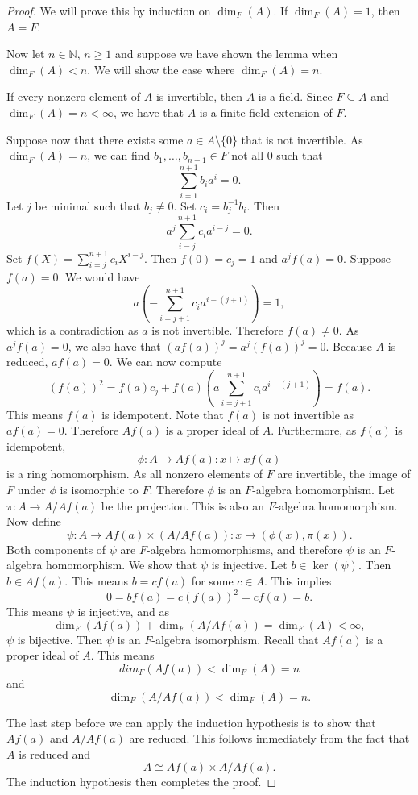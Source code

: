 \documentclass[12pt,a4paper]{amsart}
\theoremstyle{definition}
\begin{document}
\begin{proof}
We will prove this by induction on $\dim_F(A)$.
If $\dim_F(A)=1$, then $A=F$.

Now let $n\in\mathds{N}$, $n\geq1$ and suppose we have shown the lemma when $\dim_F(A)<n$.
We will show the case where $\dim_F(A)=n$.

If every nonzero element of $A$ is invertible, then $A$ is a field.
Since $F\subseteq A$ and $\dim_F(A)=n<\infty$, we have that $A$ is a finite field extension of $F$.

Suppose now that there exists some $a\in A\setminus\{0\}$ that is not invertible.
As $\dim_F(A)=n$, we can find $b_1,\ldots,b_{n+1}\in F$ not all $0$ such that $$\sum_{i=1}^{n+1}b_ia^i=0.$$
Let $j$ be minimal such that $b_j\neq0$. Set $c_i=b_j^{-1}b_i$.
Then $$a^j\sum_{i=j}^{n+1}c_ia^{i-j}=0.$$
Set $f(X)=\sum_{i=j}^{n+1}c_iX^{i-j}$.
Then $f(0)=c_j=1$ and $a^jf(a)=0$. Suppose $f(a)=0$. We would have $$a\left(-\sum_{i=j+1}^{n+1}c_ia^{i-(j+1)}\right)=1,$$ which is a contradiction as $a$ is not invertible.
Therefore $f(a)\neq0$. As $a^jf(a)=0$, we also have that $(af(a))^j=a^j(f(a))^j=0$.
Because $A$ is reduced, $af(a)=0$.
We can now compute
$$(f(a))^2=f(a)c_j+f(a)\left(a\sum_{i=j+1}^{n+1}c_ia^{i-(j+1)}\right)=f(a).$$
This means $f(a)$ is idempotent.
Note that $f(a)$ is not invertible as $af(a)=0$.
Therefore $Af(a)$ is a proper ideal of $A$.
Furthermore, as $f(a)$ is idempotent, $$\phi:A\to Af(a):x\mapsto xf(a)$$ is a ring homomorphism.
As all nonzero elements of $F$ are invertible, the image of $F$ under $\phi$ is isomorphic to $F$. Therefore $\phi$ is an $F$-algebra homomorphism.
Let $\pi:A\to A/Af(a)$ be the projection. This is also an $F$-algebra homomorphism.
Now define $$\psi:A\to Af(a)\times(A/Af(a)):x\mapsto(\phi(x),\pi(x)).$$
Both components of $\psi$ are $F$-algebra homomorphisms, and therefore $\psi$ is an $F$-algebra homomorphism.
We show that $\psi$ is injective.
Let $b\in \ker(\psi)$. Then $b\in Af(a)$. This means $b=cf(a)$ for some $c\in A$. This implies $$0=bf(a)=c(f(a))^2=cf(a)=b.$$
This means $\psi$ is injective, and as $$\dim_F(Af(a))+\dim_F(A/Af(a))=\dim_F(A)<\infty,$$ $\psi$ is bijective.
Then $\psi$ is an $F$-algebra isomorphism.
Recall that $Af(a)$ is a proper ideal of $A$. This means $$dim_F(Af(a))<\dim_F(A)=n$$ and $$\dim_F(A/Af(a))<\dim_F(A)=n.$$

The last step before we can apply the induction hypothesis is to show that $Af(a)$ and $A/Af(a)$ are reduced.
This follows immediately from the fact that $A$ is reduced and $$A\cong Af(a)\times A/Af(a).$$
The induction hypothesis then completes the proof.
\end{proof}
\end{document}
